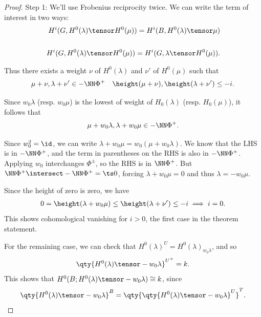 \begin{proof}

Step 1: We'll use Frobenius reciprocity twice. We can write the term of
interest in two ways:
\begin{align*}  
H^i(G, H^0(\lambda) \tensor H^0(\mu)) =
H^i(B, H^0(\lambda) \tensor \mu)
\\ \\
H^i(G, H^0(\lambda) \tensor H^0(\mu)) =
H^i(G, \lambda \tensor H^0(\mu))
.\end{align*}

Thus there exists a weight \(\nu\) of \(H^0(\lambda)\) and \(\nu'\) of
\(H^0(\mu)\) such that
\begin{align*}  
\mu + \nu, \lambda + \nu' \in - \NN \Phi^+ \quad \height(\mu+\nu), \height(\lambda + \nu') \leq -i
.\end{align*}

Since \(w_0\lambda\) (resp. \(w_0\mu\)) is the lowest of weight of
\(H_0(\lambda)\) (resp. \(H_0(\mu)\)), it follows that
\begin{align*}  
\mu + w_0 \lambda, \lambda + w_0\mu \in -\NN \Phi^+
.\end{align*}

Since \(w_0^2 = \id\), we can write
\(\lambda + w_0\mu = w_0(\mu + w_0 \lambda)\). We know that the LHS is
in \(-\NN \Phi^+\), and the term in parentheses on the RHS is also in
\(-\NN \Phi^+\). Applying \(w_0\) interchanges \(\Phi^\pm\), so the RHS
is in \(\NN \Phi^+\). But \(\NN \Phi^+ \intersect -\NN\Phi^+ = \ts 0\),
forcing \(\lambda + w_0 \mu = 0\) and thus \(\lambda = -w_0 \mu\).

Since the height of zero is zero, we have
\begin{align*}  
0 = \height(\lambda + w_0 \mu)
\leq \height(\lambda + \nu') \leq -i \implies i=0
.\end{align*} This shows cohomological vanishing for \(i>0\), the first
case in the theorem statement.

For the remaining case, we can check that
\(H^0(\lambda)^{U} = H^0(\lambda)_{w_0 \lambda}\), and so
\begin{align*}  
\qty{H^0(\lambda) \tensor -w_0 \lambda}^{U^+} = k
.\end{align*} This shows that
\(H^0(B; H^0(\lambda) \tensor -w_0\lambda ) \cong k\), since
\begin{align*}  
\qty{H^0(\lambda) \tensor -w_0 \lambda}^B = \qty{ \qty{H^0(\lambda) \tensor -w_0 \lambda }^U }^T
.\end{align*}

\end{proof}

